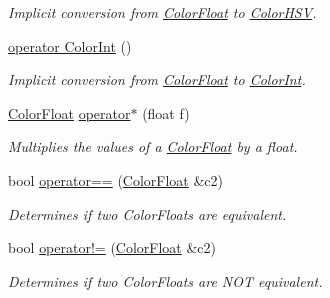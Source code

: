 \begin{DoxyCompactItemize}
\begin{DoxyCompactList}\small\item\em Implicit conversion from \hyperlink{structtsgl_1_1_color_float}{Color\-Float} to \hyperlink{structtsgl_1_1_color_h_s_v}{Color\-H\-S\-V}. \end{DoxyCompactList}\item 
\hyperlink{structtsgl_1_1_color_float_a4ef5398fd1ee469dd9b1b43c9ce5c00d}{operator Color\-Int} ()
\begin{DoxyCompactList}\small\item\em Implicit conversion from \hyperlink{structtsgl_1_1_color_float}{Color\-Float} to \hyperlink{structtsgl_1_1_color_int}{Color\-Int}. \end{DoxyCompactList}\item 
\hyperlink{structtsgl_1_1_color_float}{Color\-Float} \hyperlink{structtsgl_1_1_color_float_a09d7cc47ac3d0e23ef7339ccf33111a5}{operator$\ast$} (float f)
\begin{DoxyCompactList}\small\item\em Multiplies the values of a \hyperlink{structtsgl_1_1_color_float}{Color\-Float} by a float. \end{DoxyCompactList}\item 
bool \hyperlink{structtsgl_1_1_color_float_ac29ecf4a36624050af433d691e65651c}{operator==} (\hyperlink{structtsgl_1_1_color_float}{Color\-Float} \&c2)
\begin{DoxyCompactList}\small\item\em Determines if two Color\-Floats are equivalent. \end{DoxyCompactList}\item 
bool \hyperlink{structtsgl_1_1_color_float_afd92fcf8743d931cfbcf405209c923fc}{operator!=} (\hyperlink{structtsgl_1_1_color_float}{Color\-Float} \&c2)
\begin{DoxyCompactList}\small\item\em Determines if two Color\-Floats are {\itshape N\-O\-T} equivalent. \end{DoxyCompactList}\end{DoxyCompactItemize}
